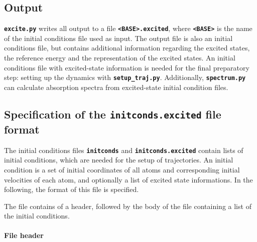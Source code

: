 \documentclass[a4paper,11pt,DIV=15,openany,twoside=false]{scrbook}
\newcommand{\ttt}[1]{\textbf{\texttt{#1}}}
\begin{document}
\subsection{Output}

\ttt{excite.py} writes all output to a file \ttt{<BASE>.excited}, where \ttt{<BASE>} is the name of the initial conditions file used as input. The output file is also an initial conditions file, but contains additional information regarding the excited states, the reference energy and the representation of the excited states. An initial conditions file with excited-state information is needed for the final preparatory step: setting up the dynamics with \ttt{setup\_traj.py}.
Additionally, \ttt{spectrum.py} can calculate absorption spectra from excited-state initial condition files.

\subsection{Specification of the \ttt{initconds.excited} file format}\label{sec:initcondsfile}

The initial conditions files \ttt{initconds} and \ttt{initconds.excited} contain lists of initial conditions, which are needed for the setup of trajectories. An initial condition is a set of initial coordinates of all atoms and corresponding initial velocities of each atom, and optionally a list of excited state informations. In the following, the format of this file is specified.

The file contains of a header, followed by the body of the file containing a list of the initial conditions. 

\paragraph{File header}
\end{document}

